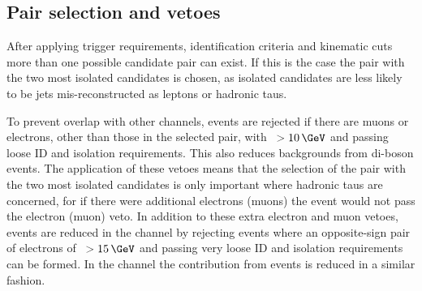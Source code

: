 \subsection{Pair selection and vetoes}
\label{sec:mssm_eventsel_pairs}
After applying trigger
requirements, identification criteria and kinematic cuts
more than one possible candidate pair can exist. If
this is the case the pair with the two most isolated candidates
 is chosen, as isolated candidates are less likely 
to be jets mis-reconstructed
as leptons or hadronic taus.

To prevent overlap with other channels, events are rejected
if there are muons or electrons, other than those in the selected pair,
with \pT~$>10\,\GeV$ and passing loose ID and isolation requirements.
This also reduces backgrounds from di-boson events. The application
of these vetoes means that the selection of the pair with the
two most isolated candidates is only important where hadronic
taus are concerned, for if there were additional electrons (muons)
the event would not pass the electron (muon) veto.
In addition to these extra electron and muon vetoes, \Zee events are 
reduced in the \etau channel by rejecting events
where an opposite-sign pair of electrons of \pT~$>15\,\GeV$
and passing very loose ID and isolation requirements can be formed. 
In the \mutau channel the contribution from \Zmm events
is reduced in a similar fashion. 

